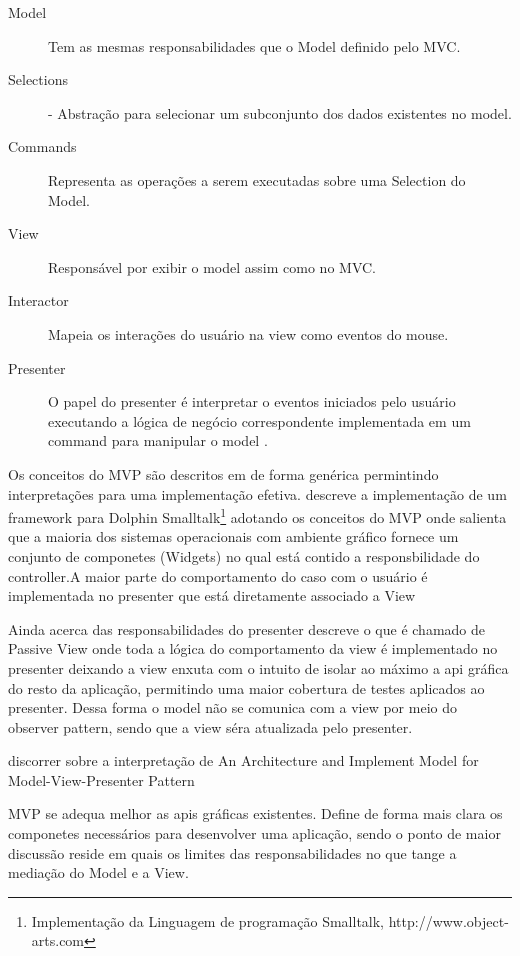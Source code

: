 \begin{description}
  \item[Model] Tem as mesmas responsabilidades que o Model definido pelo MVC.
  \item[Selections] - Abstração para selecionar um subconjunto dos dados
  existentes no model.
  \item [Commands] Representa as operações a serem executadas sobre uma
  Selection do Model.
  \item [View] Responsável por exibir o model assim como no MVC.
  \item [Interactor] Mapeia os interações do usuário na view como eventos do
  mouse.
  \item [Presenter] O papel do presenter é interpretar o eventos iniciados pelo
  usuário executando a lógica de negócio correspondente implementada em um
  command para manipular o model \cite{Potel96mvp}.
\end{description}


Os conceitos do MVP são descritos em  de forma genérica
permintindo interpretações para uma implementação efetiva.
 descreve a implementação de um framework para
Dolphin Smalltalk\footnote{Implementação da Linguagem de programação Smalltalk,
http://www.object-arts.com} adotando os conceitos do MVP onde salienta que a
maioria dos sistemas operacionais com ambiente gráfico fornece um conjunto de
componetes (Widgets) no qual está contido a responsbilidade do controller.A
maior parte do comportamento do caso com o usuário é implementada no
presenter que está diretamente associado a View

Ainda acerca das responsabilidades do presenter  descreve
o que é chamado de Passive View onde toda a lógica do comportamento da view é
implementado no presenter deixando a view enxuta com o intuito de isolar ao
máximo a api gráfica do resto da aplicação, permitindo uma maior cobertura de
testes aplicados ao presenter. Dessa forma o model não se comunica com a view
por meio do observer pattern, sendo que a view séra atualizada pelo presenter.


discorrer sobre a interpretação de An Architecture and Implement Model for
Model-View-Presenter Pattern



MVP se adequa melhor as apis gráficas existentes. Define de forma mais clara os
componetes necessários para desenvolver uma aplicação, sendo o ponto de maior
discussão reside em quais os limites das responsabilidades no que tange a
mediação do Model e a View.


